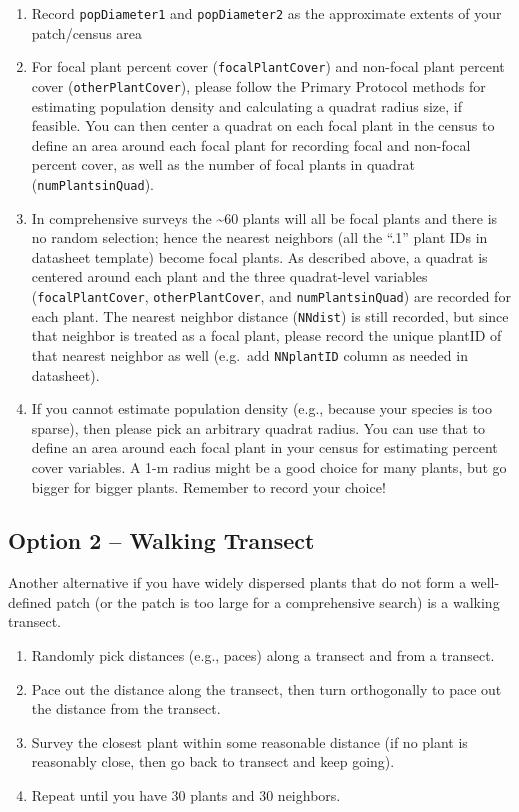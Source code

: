 \documentclass[
  letterpaper,
  DIV=11,
  numbers=noendperiod]{scrreprt}
\begin{document}
\begin{enumerate}
\def\labelenumi{\arabic{enumi}.}
\item
  Record \texttt{popDiameter1} and \texttt{popDiameter2} as the
  approximate extents of your patch/census area
\item
  For focal plant percent cover (\texttt{focalPlantCover}) and non-focal
  plant percent cover (\texttt{otherPlantCover}), please follow the
  Primary Protocol methods for estimating population density and
  calculating a quadrat radius size, if feasible. You can then center a
  quadrat on each focal plant in the census to define an area around
  each focal plant for recording focal and non-focal percent cover, as
  well as the number of focal plants in quadrat
  (\texttt{numPlantsinQuad}).
\item
  In comprehensive surveys the \textasciitilde60 plants will all be
  focal plants and there is no random selection; hence the nearest
  neighbors (all the ``.1'' plant IDs in datasheet template) become
  focal plants. As described above, a quadrat is centered around each
  plant and the three quadrat-level variables (\texttt{focalPlantCover},
  \texttt{otherPlantCover}, and \texttt{numPlantsinQuad}) are recorded
  for each plant. The nearest neighbor distance (\texttt{NNdist}) is
  still recorded, but since that neighbor is treated as a focal plant,
  please record the unique plantID of that nearest neighbor as well
  (e.g.~add \texttt{NNplantID} column as needed in datasheet).
\item
  If you cannot estimate population density (e.g., because your species
  is too sparse), then please pick an arbitrary quadrat radius. You can
  use that to define an area around each focal plant in your census for
  estimating percent cover variables. A 1-m radius might be a good
  choice for many plants, but go bigger for bigger plants. Remember to
  record your choice!
\end{enumerate}

\subsection{Option 2 -- Walking
Transect}\label{option-2-walking-transect}

Another alternative if you have widely dispersed plants that do not form
a well-defined patch (or the patch is too large for a comprehensive
search) is a walking transect.

\begin{enumerate}
\def\labelenumi{\arabic{enumi}.}
\item
  Randomly pick distances (e.g., paces) along a transect and from a
  transect.
\item
  Pace out the distance along the transect, then turn orthogonally to
  pace out the distance from the transect.
\item
  Survey the closest plant within some reasonable distance (if no plant
  is reasonably close, then go back to transect and keep going).
\item
  Repeat until you have 30 plants and 30 neighbors.
\end{enumerate}
\end{document}
